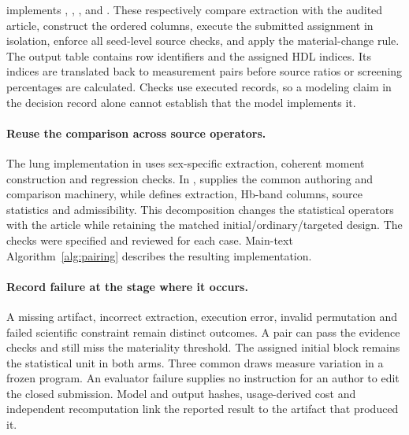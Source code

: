  implements , , ,  and . These respectively compare extraction with the audited article, construct the ordered columns, execute the submitted assignment in isolation, enforce all seed-level source checks, and apply the material-change rule. The output table contains row identifiers and the assigned HDL indices. Its indices are translated back to measurement pairs before source ratios or screening percentages are calculated. Checks use executed records, so a modeling claim in the decision record alone cannot establish that the model implements it.

\paragraph{Reuse the comparison across source operators.}
The lung implementation in  uses sex-specific extraction, coherent moment construction and regression checks. In ,  supplies the common authoring and comparison machinery, while  defines extraction, Hb-band columns, source statistics and admissibility. This decomposition changes the statistical operators with the article while retaining the matched initial/ordinary/targeted design. The checks were specified and reviewed for each case. Main-text Algorithm~\ref{alg:pairing} describes the resulting implementation.

\paragraph{Record failure at the stage where it occurs.}
A missing artifact, incorrect extraction, execution error, invalid permutation and failed scientific constraint remain distinct outcomes. A pair can pass the evidence checks and still miss the materiality threshold. The assigned initial block remains the statistical unit in both arms. Three common draws measure variation in a frozen program. An evaluator failure supplies no instruction for an author to edit the closed submission. Model and output hashes, usage-derived cost and independent recomputation link the reported result to the artifact that produced it.

